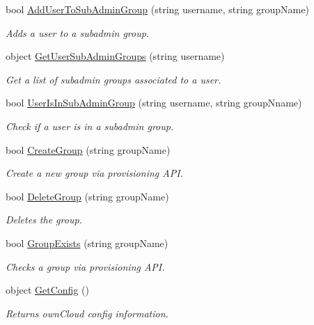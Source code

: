 \begin{DoxyCompactItemize}
bool \hyperlink{classowncloudsharp_1_1_client_a99a393c20b57e50c10ee337b09ed75b3}{Add\+User\+To\+Sub\+Admin\+Group} (string username, string group\+Name)
\begin{DoxyCompactList}\small\item\em Adds a user to a subadmin group. \end{DoxyCompactList}\item 
object \hyperlink{classowncloudsharp_1_1_client_aef2ea7c0321e3094867f456df6929e47}{Get\+User\+Sub\+Admin\+Groups} (string username)
\begin{DoxyCompactList}\small\item\em Get a list of subadmin groups associated to a user. \end{DoxyCompactList}\item 
bool \hyperlink{classowncloudsharp_1_1_client_aa3e28e78df6a8e1ddb2f92fa2b1929c5}{User\+Is\+In\+Sub\+Admin\+Group} (string username, string group\+Nname)
\begin{DoxyCompactList}\small\item\em Check if a user is in a subadmin group. \end{DoxyCompactList}\item 
bool \hyperlink{classowncloudsharp_1_1_client_ae3f6b18765fa47eed193eae4db94ae2c}{Create\+Group} (string group\+Name)
\begin{DoxyCompactList}\small\item\em Create a new group via provisioning A\+P\+I. \end{DoxyCompactList}\item 
bool \hyperlink{classowncloudsharp_1_1_client_a83390a9710020ecc7513dd03a23e192f}{Delete\+Group} (string group\+Name)
\begin{DoxyCompactList}\small\item\em Deletes the group. \end{DoxyCompactList}\item 
bool \hyperlink{classowncloudsharp_1_1_client_a0eb9c35f345906e16175605b0cc08ade}{Group\+Exists} (string group\+Name)
\begin{DoxyCompactList}\small\item\em Checks a group via provisioning A\+P\+I. \end{DoxyCompactList}\item 
object \hyperlink{classowncloudsharp_1_1_client_a8815e55195807037bd6c8d239ff7369a}{Get\+Config} ()
\begin{DoxyCompactList}\small\item\em Returns own\+Cloud config information. \end{DoxyCompactList}\item 

\end{DoxyCompactItemize}
